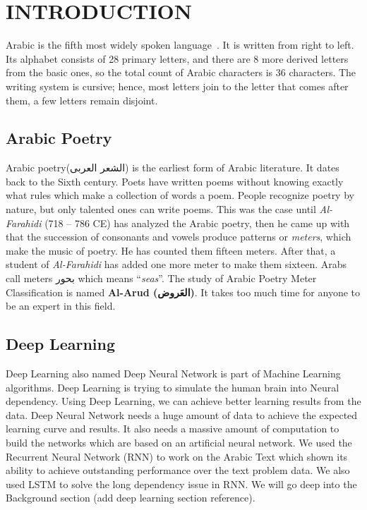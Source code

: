 \chapter{\uppercase{Introduction}}\label{ch_Intro}



 

  Arabic is the fifth most widely spoken language~\cite{Ethnologue_2017}. It is written from right to left. Its
alphabet consists of 28 primary letters, and there are 8 more derived letters
from the basic ones, so the total count of Arabic characters is 36 characters.
The writing system is cursive; hence, most letters join to the letter that comes
after them, a few letters remain disjoint.

\section{Arabic Poetry } %
Arabic poetry(\textarabic{الشعر العربى}) is the earliest form of Arabic literature. It dates back to the Sixth century. Poets have written poems without knowing exactly what rules which make a collection of words a poem. People recognize poetry by nature, but only talented ones can write poems. This was the case until \textit{Al-Farahidi} (718 – 786 CE) has analyzed the
Arabic poetry, then he came up with that the succession of consonants and vowels
produce patterns or \textit{meters}, which make the music of poetry.  He has
counted them fifteen meters.  After that, a student of \textit{Al-Farahidi} has
added one more meter to make them sixteen. Arabs call meters \textarabic{بحور}
which means ``\textit{seas}''. The study of Arabic Poetry Meter Classification is named \textbf{Al-Arud (\textarabic{العَروض})}. It takes too much time for anyone to be an expert in this field. 
\section{Deep Learning}

Deep Learning also named Deep Neural Network is part of Machine Learning algorithms. Deep Learning is trying to simulate the human brain into Neural dependency.  Using Deep Learning, we can achieve better learning results from the data. Deep Neural Network needs a huge amount of data to achieve the expected learning curve and results. It also needs a massive amount of computation to build the networks which are based on an artificial neural network. We used the Recurrent Neural Network (RNN) to work on the Arabic Text which shown its ability to achieve outstanding performance over the text problem data. We also used LSTM to solve the long dependency issue in RNN. We will go deep into the Background section (add deep learning section reference).

